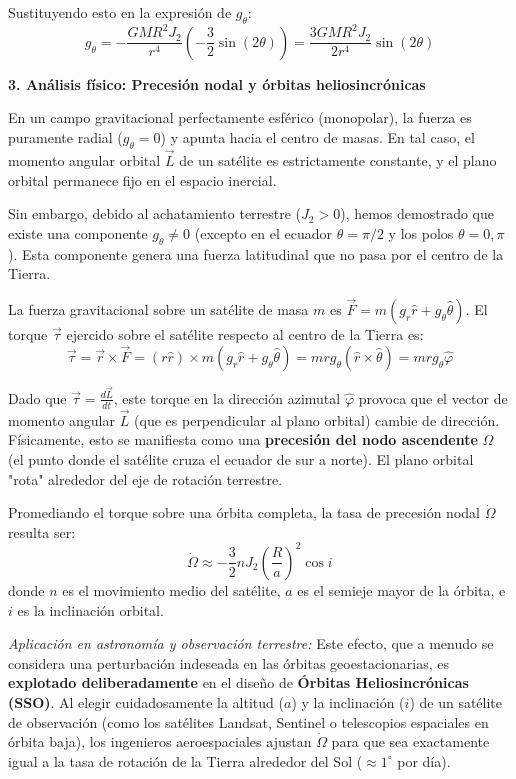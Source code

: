 \documentclass[a4paper]{article}
\begin{document}
Sustituyendo esto en la expresión de $g_\theta$:
$$ g_\theta = -\frac{GM R^2 J_2}{r^4} \left( -\frac{3}{2}\sin(2\theta) \right) = \frac{3 GM R^2 J_2}{2 r^4} \sin(2\theta) $$

\textbf{3. Análisis físico: Precesión nodal y órbitas heliosincrónicas}

En un campo gravitacional perfectamente esférico (monopolar), la fuerza es puramente radial ($g_\theta = 0$) y apunta hacia el centro de masas. En tal caso, el momento angular orbital $\vec{L}$ de un satélite es estrictamente constante, y el plano orbital permanece fijo en el espacio inercial.

Sin embargo, debido al achatamiento terrestre ($J_2 > 0$), hemos demostrado que existe una componente $g_\theta \neq 0$ (excepto en el ecuador $\theta=\pi/2$ y los polos $\theta=0, \pi$). Esta componente genera una fuerza latitudinal que no pasa por el centro de la Tierra.

La fuerza gravitacional sobre un satélite de masa $m$ es $\vec{F} = m(g_r \hat{r} + g_\theta \hat{\theta})$. El torque $\vec{\tau}$ ejercido sobre el satélite respecto al centro de la Tierra es:
$$ \vec{\tau} = \vec{r} \times \vec{F} = (r \hat{r}) \times m(g_r \hat{r} + g_\theta \hat{\theta}) = m r g_\theta (\hat{r} \times \hat{\theta}) = m r g_\theta \hat{\varphi} $$

Dado que $\vec{\tau} = \frac{d\vec{L}}{dt}$, este torque en la dirección azimutal $\hat{\varphi}$ provoca que el vector de momento angular $\vec{L}$ (que es perpendicular al plano orbital) cambie de dirección. Físicamente, esto se manifiesta como una \textbf{precesión del nodo ascendente} $\Omega$ (el punto donde el satélite cruza el ecuador de sur a norte). El plano orbital "rota" alrededor del eje de rotación terrestre.

Promediando el torque sobre una órbita completa, la tasa de precesión nodal $\dot{\Omega}$ resulta ser:
$$ \dot{\Omega} \approx -\frac{3}{2} n J_2 \left(\frac{R}{a}\right)^2 \cos i $$
donde $n$ es el movimiento medio del satélite, $a$ es el semieje mayor de la órbita, e $i$ es la inclinación orbital.

\textit{Aplicación en astronomía y observación terrestre:}
Este efecto, que a menudo se considera una perturbación indeseada en las órbitas geoestacionarias, es \textbf{explotado deliberadamente} en el diseño de \textbf{Órbitas Heliosincrónicas (SSO)}. Al elegir cuidadosamente la altitud ($a$) y la inclinación ($i$) de un satélite de observación (como los satélites Landsat, Sentinel o telescopios espaciales en órbita baja), los ingenieros aeroespaciales ajustan $\dot{\Omega}$ para que sea exactamente igual a la tasa de rotación de la Tierra alrededor del Sol ($\approx 1^\circ$ por día). 
\end{document}
